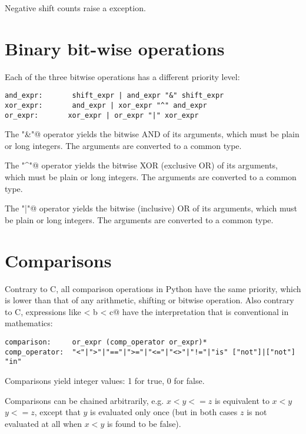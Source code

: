 Negative shift counts raise a \verb@ValueError@ exception.

\section{Binary bit-wise operations}

Each of the three bitwise operations has a different priority level:

\begin{verbatim}
and_expr:       shift_expr | and_expr "&" shift_expr
xor_expr:       and_expr | xor_expr "^" and_expr
or_expr:       xor_expr | or_expr "|" xor_expr
\end{verbatim}

The \verb@"&"@ operator yields the bitwise AND of its arguments, which
must be plain or long integers.  The arguments are converted to a
common type.

The \verb@"^"@ operator yields the bitwise XOR (exclusive OR) of its
arguments, which must be plain or long integers.  The arguments are
converted to a common type.

The \verb@"|"@ operator yields the bitwise (inclusive) OR of its
arguments, which must be plain or long integers.  The arguments are
converted to a common type.

\section{Comparisons}

Contrary to C, all comparison operations in Python have the same
priority, which is lower than that of any arithmetic, shifting or
bitwise operation.  Also contrary to C, expressions like
\verb@a < b < c@ have the interpretation that is conventional in
mathematics:

\begin{verbatim}
comparison:     or_expr (comp_operator or_expr)*
comp_operator:  "<"|">"|"=="|">="|"<="|"<>"|"!="|"is" ["not"]|["not"] "in"
\end{verbatim}

Comparisons yield integer values: 1 for true, 0 for false.

Comparisons can be chained arbitrarily, e.g. $x < y <= z$ is
equivalent to $x < y$ \verb@and@ $y <= z$, except that $y$ is
evaluated only once (but in both cases $z$ is not evaluated at all
when $x < y$ is found to be false).

